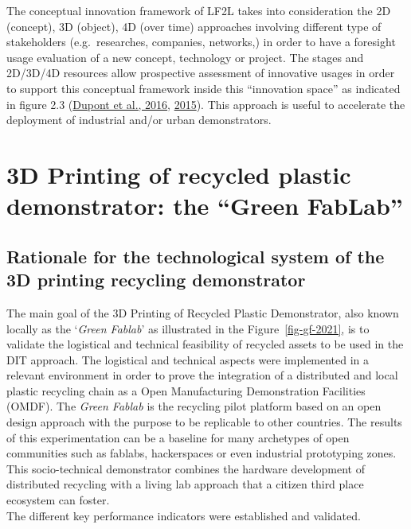 \documentclass[
  11pt,
]{article}
\begin{document}
The conceptual innovation framework of LF2L takes into consideration the
2D (concept), 3D (object), 4D (over time) approaches involving different
type of stakeholders (e.g.~researches, companies, networks,) in order to
have a foresight usage evaluation of a new concept, technology or
project. The stages and 2D/3D/4D resources allow prospective assessment
of innovative usages in order to support this conceptual framework
inside this ``innovation space'' as indicated in figure 2.3
(\protect\hyperlink{ref-Dupont2016}{Dupont et al., 2016},
\protect\hyperlink{ref-Dupont2015b}{2015}). This approach is useful to
accelerate the deployment of industrial and/or urban demonstrators.

\newpage

\hypertarget{d-printing-of-recycled-plastic-demonstrator-the-green-fablab}{%
\section{3D Printing of recycled plastic demonstrator: the ``Green
FabLab''}\label{d-printing-of-recycled-plastic-demonstrator-the-green-fablab}}

\hypertarget{rationale-for-the-technological-system-of-the-3d-printing-recycling-demonstrator}{%
\subsection{Rationale for the technological system of the 3D printing
recycling
demonstrator}\label{rationale-for-the-technological-system-of-the-3d-printing-recycling-demonstrator}}

The main goal of the 3D Printing of Recycled Plastic Demonstrator, also
known locally as the `\emph{Green Fablab}' as illustrated in the
Figure~\ref{fig-gf-2021}, is to validate the logistical and technical
feasibility of recycled assets to be used in the DIT approach. The
logistical and technical aspects were implemented in a relevant
environment in order to prove the integration of a distributed and local
plastic recycling chain as a Open Manufacturing Demonstration Facilities
(OMDF). The \emph{Green Fablab} is the recycling pilot platform based on
an open design approach with the purpose to be replicable to other
countries. The results of this experimentation can be a baseline for
many archetypes of open communities such as fablabs, hackerspaces or
even industrial prototyping zones. This socio-technical demonstrator
combines the hardware development of distributed recycling with a living
lab approach that a citizen third place ecosystem can foster.\\
The different key performance indicators were established and validated.
\end{document}
